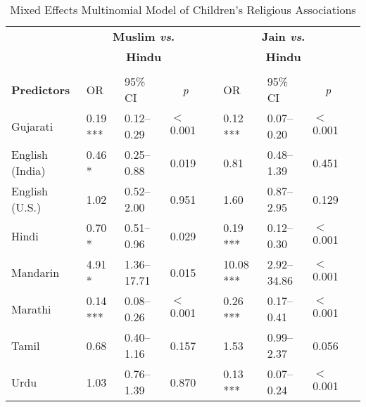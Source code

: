 \begin{table}[ht]
\small
\caption{Mixed Effects Multinomial Model of Children's Religious Associations}
    \centering
    \vspace{5pt}
    \setlength{\tabcolsep}{1.75pt} 
\begin{threeparttable}
\begin{tabular}{lllllllll}
\toprule
\midrule
& \multicolumn{3}{c}{\textbf{Muslim \textit{vs}.}} & & \multicolumn{3}{c}{\textbf{Jain \textit{vs}.}}\\
& \multicolumn{3}{c}{\textbf{Hindu}\tnote{a}} & & \multicolumn{3}{c}{\textbf{Hindu}\tnote{a}}\\
\cline{2-4} \cline{6-8} \\[-.75em]
\textbf{Predictors} & OR & 95\% CI & \multicolumn{1}{c}{\textit{p}} & & OR & 95\% CI & \multicolumn{1}{c}{\textit{p}} \\ 
\midrule
Gujarati & 0.19 *** & 0.12--0.29 & $<$0.001 &  & 0.12 *** & 0.07--0.20 & $<$0.001 \\ 

English (India) & 0.46 * & 0.25--0.88 & 0.019 &  & 0.81 & 0.48--1.39 & 0.451 \\ 

English (U.S.) & 1.02 & 0.52--2.00 & 0.951 &  & 1.60 & 0.87--2.95 & 0.129 \\ 

Hindi & 0.70 * & 0.51--0.96 & 0.029 &  & 0.19 *** & 0.12--0.30 & $<$0.001 \\ 

Mandarin & 4.91 * & 1.36--17.71 & 0.015 &  & 10.08 *** & 2.92--34.86 & $<$0.001 \\ 
   
Marathi & 0.14 *** & 0.08--0.26 & $<$0.001 &  & 0.26 *** & 0.17--0.41 & $<$0.001 \\ 

Tamil & 0.68 & 0.40--1.16 & 0.157 &  & 1.53 & 0.99--2.37 & 0.056 \\ 

Urdu & 1.03 & 0.76--1.39 & 0.870 &  & 0.13 *** & 0.07--0.24 & $<$0.001 \\ 


\end{tabular}
\end{threeparttable}
\end{table}
